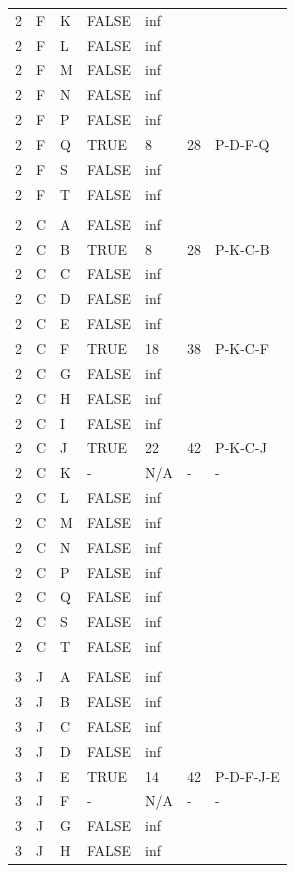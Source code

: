 \documentclass[11pt]{book}
\renewcommand{\=}[1]{\stackrel{#1}{=}} %
\theoremstyle{definition}
\theoremstyle{remark}
\begin{document}
\begin{longtable}{lllllll}
2 & F & K & FALSE & inf &  &  \\
2 & F & L & FALSE & inf &  &  \\
2 & F & M & FALSE & inf &  &  \\
2 & F & N & FALSE & inf &  &  \\
2 & F & P & FALSE & inf &  &  \\
2 & F & Q & TRUE & 8 & 28 & P-D-F-Q \\
2 & F & S & FALSE & inf &  &  \\
2 & F & T & FALSE & inf &  &  \\
 &  &  &  &  &  &  \\
2 & C & A & FALSE & inf &  &  \\
2 & C & B & TRUE & 8 & 28 & P-K-C-B \\
2 & C & C & FALSE & inf &  &  \\
2 & C & D & FALSE & inf &  &  \\
2 & C & E & FALSE & inf &  &  \\
2 & C & F & TRUE & 18 & 38 & P-K-C-F \\
2 & C & G & FALSE & inf &  &  \\
2 & C & H & FALSE & inf &  &  \\
2 & C & I & FALSE & inf &  &  \\
2 & C & J & TRUE & 22 & 42 & P-K-C-J \\
2 & C & K & - & N/A & - & - \\
2 & C & L & FALSE & inf &  &  \\
2 & C & M & FALSE & inf &  &  \\
2 & C & N & FALSE & inf &  &  \\
2 & C & P & FALSE & inf &  &  \\
2 & C & Q & FALSE & inf &  &  \\
2 & C & S & FALSE & inf &  &  \\
2 & C & T & FALSE & inf &  &  \\
 &  &  &  &  &  &  \\
3 & J & A & FALSE & inf &  &  \\
3 & J & B & FALSE & inf &  &  \\
3 & J & C & FALSE & inf &  &  \\
3 & J & D & FALSE & inf &  &  \\
3 & J & E & TRUE & 14 & 42 & P-D-F-J-E \\
3 & J & F & - & N/A & - & - \\
3 & J & G & FALSE & inf &  &  \\
3 & J & H & FALSE & inf &  &  \\

\end{longtable}
\end{document}
